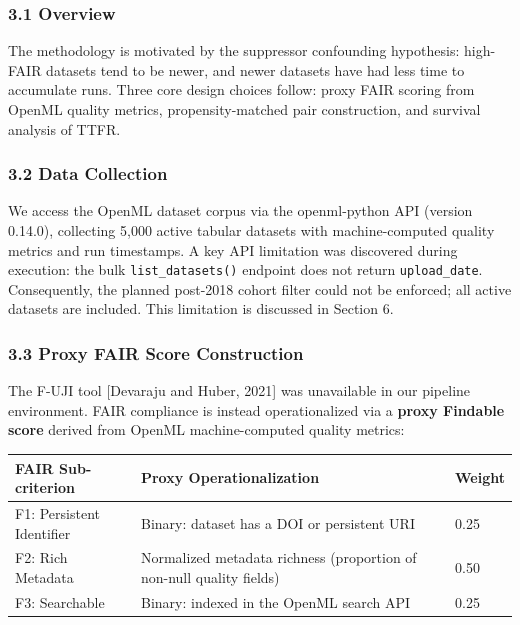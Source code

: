 
\subsubsection{3.1 Overview}

The methodology is motivated by the suppressor confounding hypothesis: high-FAIR datasets tend to be newer, and newer datasets have had less time to accumulate runs. Three core design choices follow: proxy FAIR scoring from OpenML quality metrics, propensity-matched pair construction, and survival analysis of TTFR.

\subsubsection{3.2 Data Collection}

We access the OpenML dataset corpus via the openml-python API (version 0.14.0), collecting 5,000 active tabular datasets with machine-computed quality metrics and run timestamps. A key API limitation was discovered during execution: the bulk \texttt{list_datasets()} endpoint does not return \texttt{upload_date}. Consequently, the planned post-2018 cohort filter could not be enforced; all active datasets are included. This limitation is discussed in Section 6.

\subsubsection{3.3 Proxy FAIR Score Construction}

The F-UJI tool [Devaraju and Huber, 2021] was unavailable in our pipeline environment. FAIR compliance is instead operationalized via a \textbf{proxy Findable score} derived from OpenML machine-computed quality metrics:

\begin{table}[htbp]
\centering
\begin{tabular}{lll}
\toprule
FAIR Sub-criterion & Proxy Operationalization & Weight \\
\midrule
F1: Persistent Identifier & Binary: dataset has a DOI or persistent URI & 0.25 \\
F2: Rich Metadata & Normalized metadata richness (proportion of non-null quality fields) & 0.50 \\
F3: Searchable & Binary: indexed in the OpenML search API & 0.25 \\
\bottomrule
\end{tabular}
\end{table}

